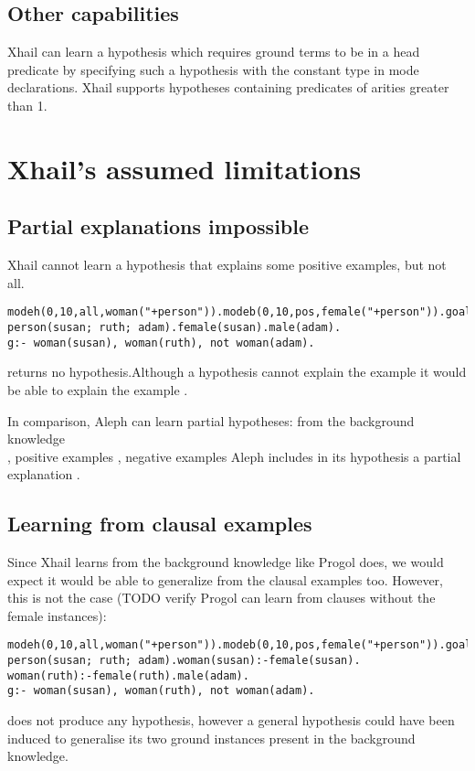 \subsection{Other capabilities}
Xhail can learn a hypothesis which requires ground terms to be in a head predicate by specifying such a hypothesis with the constant type  in mode declarations. Xhail supports hypotheses containing predicates of arities greater than 1.

\section{Xhail's assumed limitations}

\subsection{Partial explanations impossible}
Xhail cannot learn a hypothesis that explains some positive examples, but not all.

\begin{lstlisting}
modeh(0,10,all,woman("+person")).modeb(0,10,pos,female("+person")).goal(g).
person(susan; ruth; adam).female(susan).male(adam).
g:- woman(susan), woman(ruth), not woman(adam).
\end{lstlisting}
returns no hypothesis.Although a hypothesis
 cannot explain the example  it would be able to explain the example .

In comparison, Aleph can learn partial hypotheses: from the background knowledge\\
, positive examples , negative examples  Aleph includes in its hypothesis a partial explanation
.

\subsection{Learning from clausal examples}
Since Xhail learns from the background knowledge like Progol does, we would expect it would be able to generalize from the clausal examples too. However, this is not the case (TODO verify Progol can learn from clauses without the female instances):

\begin{lstlisting}
modeh(0,10,all,woman("+person")).modeb(0,10,pos,female("+person")).goal(g).
person(susan; ruth; adam).woman(susan):-female(susan).
woman(ruth):-female(ruth).male(adam).
g:- woman(susan), woman(ruth), not woman(adam).
\end{lstlisting}
does not produce any hypothesis, however a general hypothesis
 could have been induced to generalise its two ground instances present in the background knowledge.

